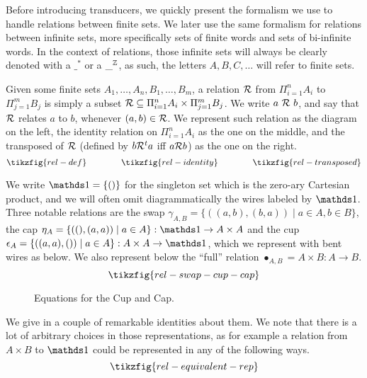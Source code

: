 

\label{sec:logic}

Before introducing transducers, we quickly present the formalism we use to handle relations between finite sets. We later use the same formalism for relations between infinite sets, more specifically sets of finite words and sets of bi-infinite words.
In the context of relations, those infinite sets will always be clearly denoted with a $\_^*$ or a $\_^{\mathbb{Z}}$, as such, the letters $A,B,C,\dots$ will refer to finite sets.

Given some finite sets $A_1,\dots,A_n,B_1,\dots,B_m$, a relation ${\mathcal{R}}$ from $\Pi_{i=1}^n A_i$ to $\Pi_{j=1}^m B_j$ is simply a subset ${\mathcal{R}} \subseteq \Pi_{i=1}^n A_i \times \Pi_{j=1}^m B_j$. We write $a~{\mathcal{R}}~b$, and say that ${\mathcal{R}}$ relates $a$ to $b$, whenever $(a,b) \in {\mathcal{R}}$. We represent such relation as the diagram on the left, the identity relation on $\Pi_{i=1}^n A_i$ as the one on the middle, and the transposed of ${\mathcal{R}}$ (defined by $b{\mathcal{R}}^t a$ iff $a{\mathcal{R}} b$) as the one on the right.
\[ \tikzfig{rel-def} \qquad \qquad \tikzfig{rel-identity} \qquad \qquad \tikzfig{rel-transposed} \]

We write $\one = \{()\}$ for the singleton set which is the zero-ary Cartesian product, and we will often omit diagrammatically the wires labeled by $\one$. Three notable relations are the swap $\gamma_{A,B} = \{ ((a,b),(b,a)) \mid a \in A, b \in B\}$, the cap $\eta_A = \{ ((),(a,a)) \mid a \in A\} : \one \to A \times A$ and the cup $\epsilon_A = \{((a,a),()) \mid a \in A\} : A \times A \to \one$, which we represent with bent wires as below. We also represent below the ``full'' relation $\bullet_{A,B} = A \times B : A \to B$.
\[ \tikzfig{rel-swap-cup-cap} \]
\begin{figure}[!h]
	\caption{Equations for the Cup and Cap.} 
	\label{fig:rel-equations-cup-cap}
\end{figure}
We give in  a couple of remarkable identities about them.
We note that there is a lot of arbitrary choices in those representations, as for example a relation from $A \times B$ to $\one$ could be represented in any of the following ways.
\[ \tikzfig{rel-equivalent-rep}\]





